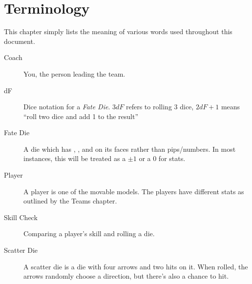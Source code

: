 \chapter{Terminology}
This chapter simply lists the meaning of various words used throughout this document.

\begin{description}
\item[Coach] You, the person leading the team.
\item[dF] Dice notation for a \textit{Fate Die}. 
$3dF$ refers to rolling 3 \fate{} dice, $2dF+1$ means ``roll two \fate{} dice and add 1 to the result''
\item[Fate Die] A die which has \plus{}, \minus{}, and \blank{} on its faces rather than pips/numbers.
In most instances, this will be treated as a $\pm 1$ or a 0 for stats.
\item[Player] A player is one of the movable models.
The players have different stats as outlined by the Teams chapter.
\item[Skill Check] Comparing a player's skill and rolling a \fate{} die.
\item[Scatter Die] A scatter die is a die with four arrows and two hits on it. When rolled, the arrows randomly choose a direction, but there's also a chance to hit.
\end{description}